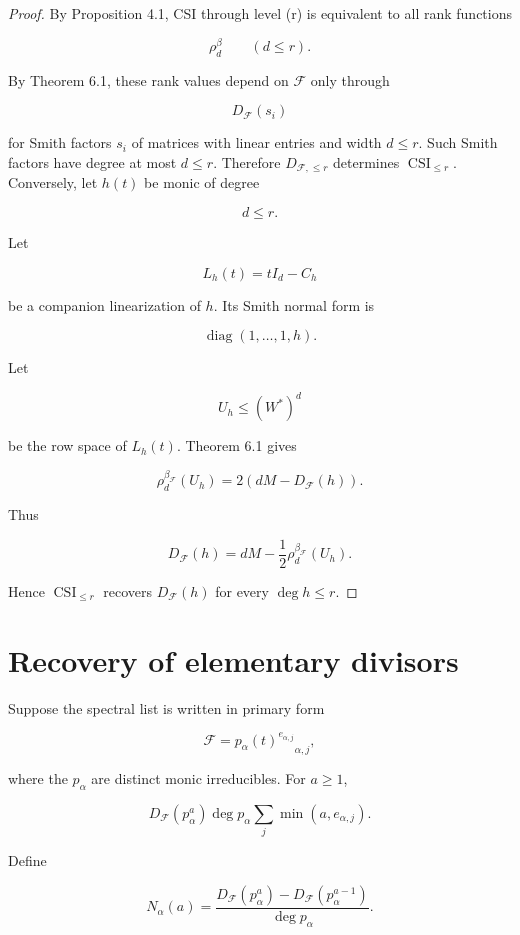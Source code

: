 \documentclass[11pt]{article}
\begin{document}
\begin{proof}
By Proposition 4.1, CSI through level (r) is equivalent to all rank functions

\[
\rho_d^\beta
\qquad
(d\le r).
\]

By Theorem 6.1, these rank values depend on $\mathcal F$ only through

\[
D_{\mathcal F}(s_i)
\]

for Smith factors $s_i$ of matrices with linear entries and width $d\le r$. Such Smith factors have degree at most $d\le r$. Therefore $D_{\mathcal F,\le r}$ determines $\operatorname{CSI}_{\le r}$. Conversely, let $h(t)$ be monic of degree

\[
d\le r.
\]

Let

\[
L_h(t)=tI_d-C_h
\]

be a companion linearization of $h$. Its Smith normal form is

\[
\operatorname{diag}(1,\ldots,1,h).
\]

Let

\[
U_h\le (W^*)^d
\]

be the row space of $L_h(t)$. Theorem 6.1 gives

\[
\rho_d^{\beta_{\mathcal F}}(U_h)
=2\left(
dM-D_{\mathcal F}(h)
\right).
\]

Thus

\[
\boxed{
D_{\mathcal F}(h)
=dM-\frac12\rho_d^{\beta_{\mathcal F}}(U_h).
}
\tag{6.4}
\]

Hence $\operatorname{CSI}_{\le r}$ recovers $D_{\mathcal F}(h)$ for every $\deg h\le r$.

\end{proof}

\section{Recovery of elementary divisors}

Suppose the spectral list is written in primary form

\[
\mathcal F=
{p_\alpha(t)^{e_{\alpha,j}}}_{\alpha,j},
\]

where the $p_\alpha$ are distinct monic irreducibles. For $a\ge1$,

\[
D_{\mathcal F}(p_\alpha^a)
\deg p_\alpha
\sum_j\min(a,e_{\alpha,j}).
\tag{7.1}
\]

Define

\[
N_\alpha(a)
=\frac{
D_{\mathcal F}(p_\alpha^a)
-D_{\mathcal F}(p_\alpha^{a-1})
}{
\deg p_\alpha
}.
\]
\end{document}
